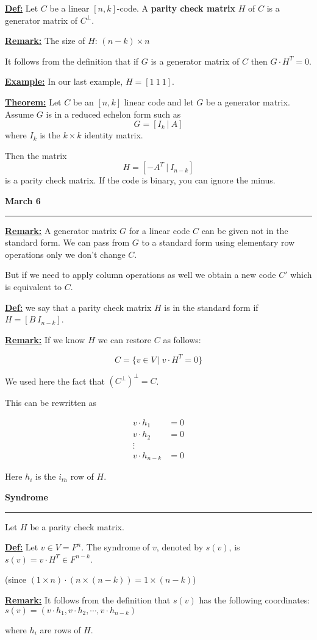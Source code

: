 \documentclass{article}
\newcommand{\header}[1]{
	\begin{Large}
	\noindent\textbf{#1}
	\vspace{2pt}
	\hrule
	\vspace{16pt}
	\end{Large}
	\normalsize
}
\renewcommand{\b}[1]{\textbf{#1}}
\newcommand{\ul}[1]{\underline{#1}}
\renewcommand{\aligned}[1]{
	\begin{align*}
		#1
	\end{align*}
}
\newcommand{\newdef}[2]{\b{\ul{#1:}} #2}
\begin{document}
\newdef{Def}{
	Let $C$ be a linear $[n, k]$-code. A \b{parity check matrix} $H$ of $C$
	is a generator matrix of $C^\perp$.
}

\newdef{Remark}{
	The size of $H$:  $(n-k) \times n$

	It follows from the definition that if $G$ is a generator matrix of
	$C$ then $G \cdot H^T = 0$.
}

\newdef{Example}{In our last example, $H = [1\ 1\ 1]$.}

\newdef{Theorem}{
Let $C$ be an $[n, k]$ linear code and let $G$ be a generator matrix.
Assume $G$ is in a reduced echelon form such as
\[G = [I_k\ |\ A]\] where $I_k$ is the $k \times k$ identity matrix.

Then the matrix
\[
	H = [-A^T\ |\ I_{n-k}]
\]
is a parity check matrix. If the code is binary, you can ignore the
minus.
}

\header{March 6}

\newdef{Remark}{
	A generator matrix $G$ for a linear code $C$ can be given not in the
	standard form. We can pass from $G$ to a standard form using elementary
	row operations only we don't change $C$.

	But if we need to apply column operations as well we obtain a new code
	$C'$ which is equivalent to $C$.
}

\newdef{Def}{
we say that a parity check matrix $H$ is in the standard form if
$H = [B\ I_{n-k}]$.
}

\newdef{Remark}{
	If we know $H$ we can restore $C$ as follows:

	\[C = \{v \in V\ |\ v \cdot H^T = 0\}\]

	We used here the fact that $(C^\perp)^\perp = C$.

	This can be rewritten as
	\aligned{
		v \cdot h_1     & = 0 \\
		v \cdot h_2     & = 0 \\
		\vdots          &     \\
		v \cdot h_{n-k} & = 0
	}
	Here $h_i$ is the $i_{th}$ row of $H$.
}

\header{Syndrome}

Let $H$ be a parity check matrix.

\newdef{Def}{
	Let $v \in V = F^n$. The syndrome of $v$, denoted by $s(v)$, is
	$s(v) = v \cdot H^T \in F^{n-k}$.

	(since $(1 \times n) \cdot (n \times (n-k)) = 1 \times (n-k)$)
}

\newdef{Remark}{
	It follows from the definition that $s(v)$ has the following
	coordinates:
	$s(v) = (v \cdot h_1, v \cdot h_2, \cdots, v \cdot h_{n-k})$

	where $h_i$ are rows of $H$.
}
\end{document}
